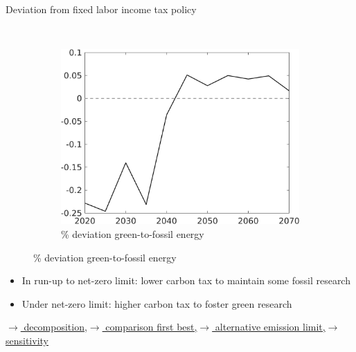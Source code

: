 \documentclass[11pt,aspectratio=169]{beamer}
\begin{document}
\begin{frame}{Deviation from fixed labor income tax policy}
\begin{figure}
\begin{subfigure}{0.4\textwidth}
	\end{subfigure}
	\begin{minipage}[]{0.1\textwidth}
		\
	\end{minipage}
\begin{subfigure}{0.4\textwidth}
	\caption{{\% deviation green-to-fossil energy }}
	\includegraphics[width=1\textwidth]{../codding_model/own_basedOnFried/optimalPol_010922_revision/figures/all_13Sept22/NewCalib_polTaulFixedPer_T_GFF_Sun2_emnet1_spillover0_knspil3_xgr0_nsk0_sep0_extern0_PV1_etaa0.79.png}
\end{subfigure}
\end{figure}
\vspace{3mm}
\begin{block}{}
	\begin{itemize}
		\item In run-up to net-zero limit: lower carbon tax to maintain some fossil research
		\item Under net-zero limit: higher carbon tax to foster green research
	\end{itemize}
\end{block}	

\vspace{-3mm}
\hfill	\hyperlink{decomp}{\tiny{$\rightarrow$ decomposition,}}\hyperlink{compfb}{\tiny{$\rightarrow$ comparison first best,}}\hyperlink{altemsdecomp}{\tiny{$\rightarrow$ alternative emission limit,}}\hyperlink{sensphi}{\tiny{$\rightarrow$ sensitivity}}
\hypertarget{mec}{}
\end{frame}
\end{document}

